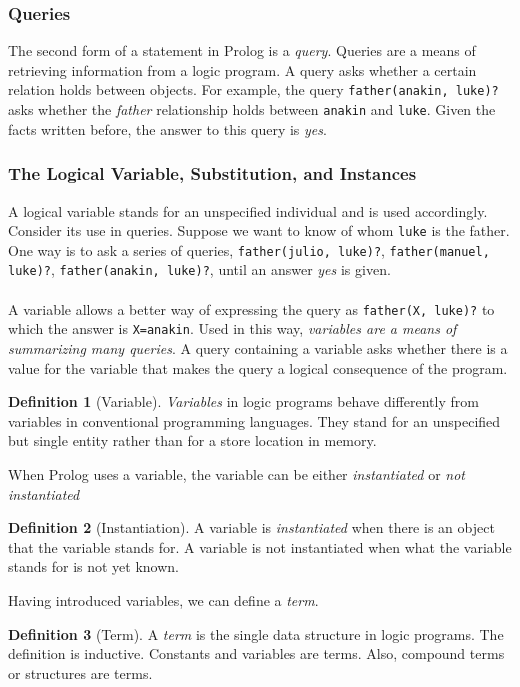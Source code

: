 \documentclass{report}
\theoremstyle{definition}
\theoremstyle{definition}
\newtheorem*{definition*}{Definition}
\newcommand{\ttt}[1]{\texttt{#1}}
\begin{document}
\subsubsection{Queries}
The second form of a statement in Prolog is a \textit{query}. Queries are a means of retrieving information from a logic program. A query asks whether a certain relation holds between objects. For example, the query \ttt{father(anakin, luke)?} asks whether the \textit{father} relationship holds between \ttt{anakin} and \ttt{luke}. Given the facts written before, the answer to this query is \textit{yes}.
\subsubsection{The Logical Variable, Substitution, and Instances}
A logical variable stands for an unspecified individual and is used accordingly. Consider its use in queries. Suppose we want to know of whom \ttt{luke} is the father. One way is to ask a series of queries, \ttt{father(julio, luke)?}, \ttt{father(manuel, luke)?}, \ttt{father(anakin, luke)?}, until an answer \textit{yes} is given.\\\\
A variable allows a better way of expressing the query as \ttt{father(X, luke)?} to which the answer is \ttt{X=anakin}. Used in this way, \textit{variables are a means of summarizing many queries}. A query containing a variable asks whether there is a value for the variable that makes the query a logical consequence of the program.
\begin{definition*}[Variable]
	\textit{Variables} in logic programs behave differently from variables in conventional programming languages. They stand for an unspecified but single entity rather than for a store location in memory.
\end{definition*}
When Prolog uses a variable, the variable can be either \textit{instantiated} or \textit{not instantiated}
\begin{definition*}[Instantiation]
	A variable is \textit{instantiated} when there is an object that the variable stands for. A variable is not instantiated when what the variable stands for is not yet known.
\end{definition*}
Having introduced variables, we can define a \textit{term}.
\begin{definition*}[Term]
	A \textit{term} is the single data structure in logic programs. The definition is inductive. Constants and variables are terms. Also, compound terms or structures are terms.
\end{definition*}
\end{document}
